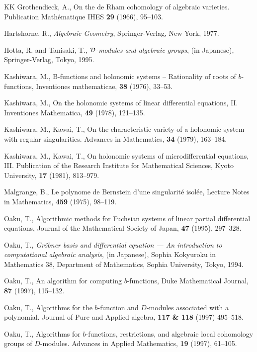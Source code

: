 \documentclass[12pt]{article}
\def\Dsc{ {\cal D} }
\begin{document}
\begin{thebibliography}{KK}
 Grothendieck, A.,
On the de Rham cohomology of algebraic varieties.
Publication Math\'ematique IHES {\bf 29} (1966), 95--103.

 Hartshorne, R.,
{\it Algebraic Geometry},
Springer-Verlag, New York, 1977.

 Hotta, R. and Tanisaki, T.,
{\it $\Dsc$-modules and algebraic groups},
(in Japanese),
Springer-Verlag, Tokyo,  1995.

Kashiwara, M.,
B-functions and holonomic systems -- Rationality of roots of $b$-functions,
Inventiones mathematicae, {\bf 38} (1976), 33--53.

 Kashiwara, M.,  
On the holonomic systems of linear differential equations, II. 
Inventiones Mathematica, {\bf 49} (1978),  121--135.

 Kashiwara, M., Kawai, T.,  
On the characteristic variety of a holonomic system with 
regular singularities.
Advances in Mathematics, {\bf 34} (1979), 163--184.  

 Kashiwara, M., Kawai, T.,
On holonomic systems of microdifferential equations, III. 
Publication of the Research Institute for Mathematical Sciences, 
Kyoto University, {\bf 17} (1981), 813--979.

 Malgrange, B.,
Le polynome de Bernstein d'une singularit\'e isol\'ee,
Lecture Notes in Mathematics, {\bf 459} (1975), 98--119.

 Oaku, T.,
Algorithmic methods for Fuchsian systems of linear partial differential
equations,
Journal of the Mathematical Society of Japan,
{\bf 47} (1995), 297--328.


 Oaku, T.,
{\it 
Gr\"obner basis and differential equation --- An introduction to
computational algebraic analysis}, (in Japanese), 
Sophia Kokyuroku in Mathematics 38, Department of Mathematics, 
Sophia University, Tokyo, 1994.


 Oaku, T.,
An algorithm for computing $b$-functions,
Duke Mathematical Journal, {\bf 87} (1997), 115--132.

 Oaku, T.,
Algorithms for the $b$-function and $D$-modules associated with a polynomial.
Journal of  Pure and Applied algebra, {\bf 117 \& 118} (1997) 495--518.  

 Oaku, T., 
Algorithms for $b$-functions, restrictions, and algebraic local cohomology
groups of $D$-modules.  
Advances in Applied Mathematics, {\bf 19} (1997), 61--105.


\end{thebibliography}
\end{document}
